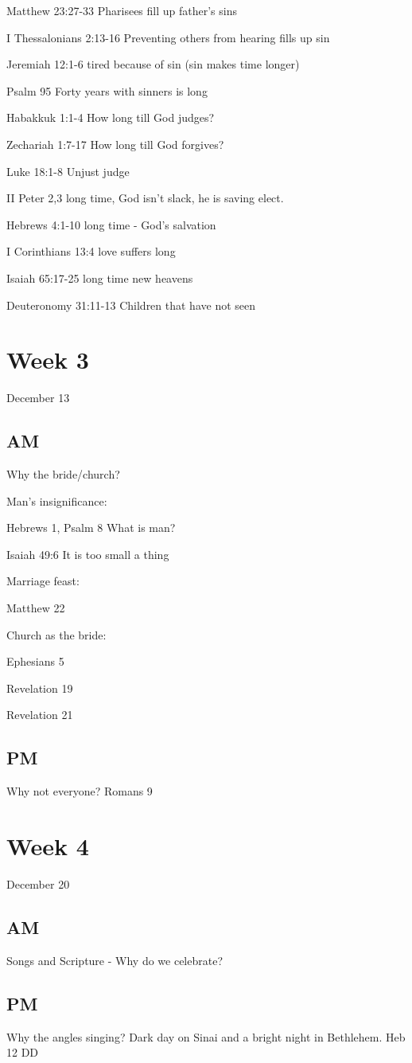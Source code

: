 \documentclass{article}
\begin{document}
Matthew 23:27-33   Pharisees fill up father's sins

I Thessalonians 2:13-16  Preventing others from hearing fills up sin

Jeremiah 12:1-6   tired because of sin (sin makes time longer)

Psalm 95   Forty years with sinners is long

Habakkuk 1:1-4  How long till God judges?

Zechariah 1:7-17  How long till God forgives?

Luke 18:1-8  Unjust judge

II Peter 2,3   long time, God isn't slack, he is saving elect.

Hebrews 4:1-10  long time - God's salvation

I Corinthians 13:4  love suffers long

Isaiah 65:17-25  long time new heavens

Deuteronomy 31:11-13   Children that have not seen





\section{Week 3}
December 13

\subsection{AM}  Why the bride/church?

Man's insignificance:

Hebrews 1, Psalm 8 What is man?

Isaiah 49:6 It is too small a thing

Marriage feast:

Matthew 22



Church as the bride:

Ephesians 5

Revelation 19

Revelation 21

\subsection{PM}  Why not everyone?
Romans 9








\section{Week 4}
December 20

\subsection{AM}  Songs and Scripture  - Why do we celebrate?

\subsection{PM}  Why the angles singing?  Dark day on Sinai and a bright night in Bethlehem.  Heb 12 DD
\end{document}
